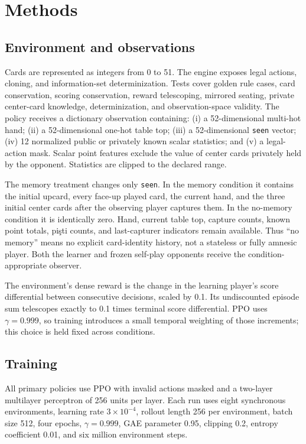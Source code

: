 \documentclass[10pt]{article}
\newcommand{\code}[1]{\texttt{#1}}
\begin{document}
\section{Methods}

\subsection{Environment and observations}

Cards are represented as integers from 0 to 51. The engine exposes legal actions, cloning, and information-set determinization. Tests cover golden rule cases, card conservation, scoring conservation, reward telescoping, mirrored seating, private center-card knowledge, determinization, and observation-space validity. The policy receives a dictionary observation containing: (i) a 52-dimensional multi-hot hand; (ii) a 52-dimensional one-hot table top; (iii) a 52-dimensional \code{seen} vector; (iv) 12 normalized public or privately known scalar statistics; and (v) a legal-action mask. Scalar point features exclude the value of center cards privately held by the opponent. Statistics are clipped to the declared range.

The memory treatment changes only \code{seen}. In the memory condition it contains the initial upcard, every face-up played card, the current hand, and the three initial center cards after the observing player captures them. In the no-memory condition it is identically zero. Hand, current table top, capture counts, known point totals, pişti counts, and last-capturer indicators remain available. Thus ``no memory'' means no explicit card-identity history, not a stateless or fully amnesic player. Both the learner and frozen self-play opponents receive the condition-appropriate observer.

The environment's dense reward is the change in the learning player's score differential between consecutive decisions, scaled by 0.1. Its undiscounted episode sum telescopes exactly to 0.1 times terminal score differential. PPO uses $\gamma=0.999$, so training introduces a small temporal weighting of those increments; this choice is held fixed across conditions.

\subsection{Training}

All primary policies use PPO \cite{schulman2017ppo} with invalid actions masked \cite{huang2020masking} and a two-layer multilayer perceptron of 256 units per layer. Each run uses eight synchronous environments, learning rate $3\times10^{-4}$, rollout length 256 per environment, batch size 512, four epochs, $\gamma=0.999$, GAE parameter 0.95, clipping 0.2, entropy coefficient 0.01, and six million environment steps.
\end{document}
